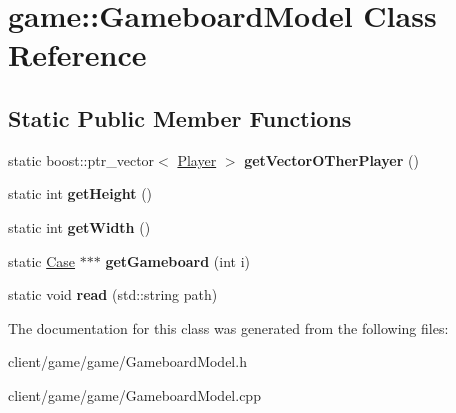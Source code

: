 \hypertarget{classgame_1_1_gameboard_model}{\section{game\-:\-:Gameboard\-Model Class Reference}
\label{classgame_1_1_gameboard_model}
}
\subsection*{Static Public Member Functions}
\begin{DoxyCompactItemize}
\item 
\hypertarget{classgame_1_1_gameboard_model_a3a095b72a8adc3e4bde68e0daf52a1a7}{static boost\-::ptr\-\_\-vector$<$ \hyperlink{classgame_1_1_player}{Player} $>$ {\bfseries get\-Vector\-O\-Ther\-Player} ()}\label{classgame_1_1_gameboard_model_a3a095b72a8adc3e4bde68e0daf52a1a7}

\item 
\hypertarget{classgame_1_1_gameboard_model_a138fed5fda87e0f1bd06f5bf1471c981}{static int {\bfseries get\-Height} ()}\label{classgame_1_1_gameboard_model_a138fed5fda87e0f1bd06f5bf1471c981}

\item 
\hypertarget{classgame_1_1_gameboard_model_aee00c393cc3b12b5ba1e4a49a74eb3fc}{static int {\bfseries get\-Width} ()}\label{classgame_1_1_gameboard_model_aee00c393cc3b12b5ba1e4a49a74eb3fc}

\item 
\hypertarget{classgame_1_1_gameboard_model_a1c89222293e370273e64636194633e57}{static \hyperlink{classgame_1_1_case}{Case} $\ast$$\ast$$\ast$ {\bfseries get\-Gameboard} (int i)}\label{classgame_1_1_gameboard_model_a1c89222293e370273e64636194633e57}

\item 
\hypertarget{classgame_1_1_gameboard_model_a77d07bad32f3021ae241454f4bef84a9}{static void {\bfseries read} (std\-::string path)}\label{classgame_1_1_gameboard_model_a77d07bad32f3021ae241454f4bef84a9}

\end{DoxyCompactItemize}


The documentation for this class was generated from the following files\-:\begin{DoxyCompactItemize}
\item 
client/game/game/Gameboard\-Model.\-h\item 
client/game/game/Gameboard\-Model.\-cpp\end{DoxyCompactItemize}
